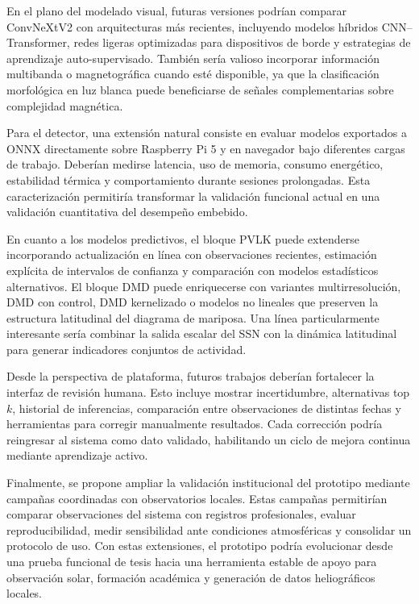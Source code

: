 En el plano del modelado visual, futuras versiones podrían comparar ConvNeXtV2
con arquitecturas más recientes, incluyendo modelos híbridos CNN--Transformer,
redes ligeras optimizadas para dispositivos de borde y estrategias de aprendizaje
auto-supervisado. También sería valioso incorporar información multibanda o
magnetográfica cuando esté disponible, ya que la clasificación morfológica en luz
blanca puede beneficiarse de señales complementarias sobre complejidad magnética.

Para el detector, una extensión natural consiste en evaluar modelos exportados a
ONNX directamente sobre Raspberry Pi 5 y en navegador bajo diferentes cargas de
trabajo. Deberían medirse latencia, uso de memoria, consumo energético,
estabilidad térmica y comportamiento durante sesiones prolongadas. Esta
caracterización permitiría transformar la validación funcional actual en una
validación cuantitativa del desempeño embebido.

En cuanto a los modelos predictivos, el bloque PVLK puede extenderse incorporando
actualización en línea con observaciones recientes, estimación explícita de
intervalos de confianza y comparación con modelos estadísticos alternativos. El
bloque DMD puede enriquecerse con variantes multirresolución, DMD con control,
DMD kernelizado o modelos no lineales que preserven la estructura latitudinal del
diagrama de mariposa. Una línea particularmente interesante sería combinar la
salida escalar del SSN con la dinámica latitudinal para generar indicadores
conjuntos de actividad.

Desde la perspectiva de plataforma, futuros trabajos deberían fortalecer la
interfaz de revisión humana. Esto incluye mostrar incertidumbre, alternativas top
$k$, historial de inferencias, comparación entre observaciones de distintas
fechas y herramientas para corregir manualmente resultados. Cada corrección
podría reingresar al sistema como dato validado, habilitando un ciclo de mejora
continua mediante aprendizaje activo.

Finalmente, se propone ampliar la validación institucional del prototipo mediante
campañas coordinadas con observatorios locales. Estas campañas permitirían
comparar observaciones del sistema con registros profesionales, evaluar
reproducibilidad, medir sensibilidad ante condiciones atmosféricas y consolidar
un protocolo de uso. Con estas extensiones, el prototipo podría evolucionar desde
una prueba funcional de tesis hacia una herramienta estable de apoyo para
observación solar, formación académica y generación de datos heliográficos
locales.